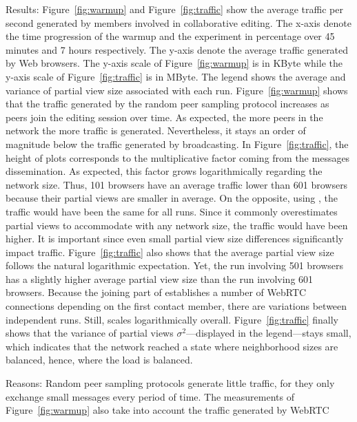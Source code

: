 \begin{asparadesc}
\item [Results:] Figure~\ref{fig:warmup} and Figure~\ref{fig:traffic} show the
  average traffic per second generated by members involved in collaborative
  editing. The x-axis denote the time progression of the warmup and the
  experiment in percentage over 45 minutes and 7 hours respectively. The y-axis
  denote the average traffic generated by Web browsers. The y-axis scale of
  Figure~\ref{fig:warmup} is in KByte while the y-axis scale of
  Figure~\ref{fig:traffic} is in MByte.  The legend shows the average and
  variance of partial view size associated with each
  run. Figure~\ref{fig:warmup} shows that the traffic generated by the random
  peer sampling protocol \SPRAY increases as peers join the editing session over
  time. As expected, the more peers in the network the more traffic is
  generated. Nevertheless, it stays an order of magnitude below the traffic
  generated by broadcasting. In Figure~\ref{fig:traffic}, the height of plots
  corresponds to the multiplicative factor coming from the messages
  dissemination. As expected, this factor grows logarithmically regarding the
  network size. Thus, 101 browsers have an average traffic lower than 601
  browsers because their partial views are smaller in average.  On the opposite,
  using \CYCLON, the traffic would have been the same for all runs. Since it
  commonly overestimates partial views to accommodate with any network size, the
  traffic would have been higher. %
  It is important since even small partial view size differences significantly
  impact traffic.  Figure~\ref{fig:traffic} also shows that the average partial
  view size follows the natural logarithmic expectation. Yet, the run involving
  501 browsers has a slightly higher average partial view size than the run
  involving 601 browsers. Because the joining part of \SPRAY establishes a
  number of WebRTC connections depending on the first contact member, there are
  variations between independent runs. Still, \SPRAY scales logarithmically
  overall. Figure~\ref{fig:traffic} finally shows that the variance of partial
  views $\sigma^2$---displayed in the legend---stays small, which indicates that
  the network reached a state where neighborhood sizes are balanced, hence,
  where the load is balanced.
\item [Reasons:] Random peer sampling protocols generate little traffic, for
  they only exchange small messages every period of time. The measurements of
  Figure~\ref{fig:warmup} also take into account the traffic generated by WebRTC

\end{asparadesc}
